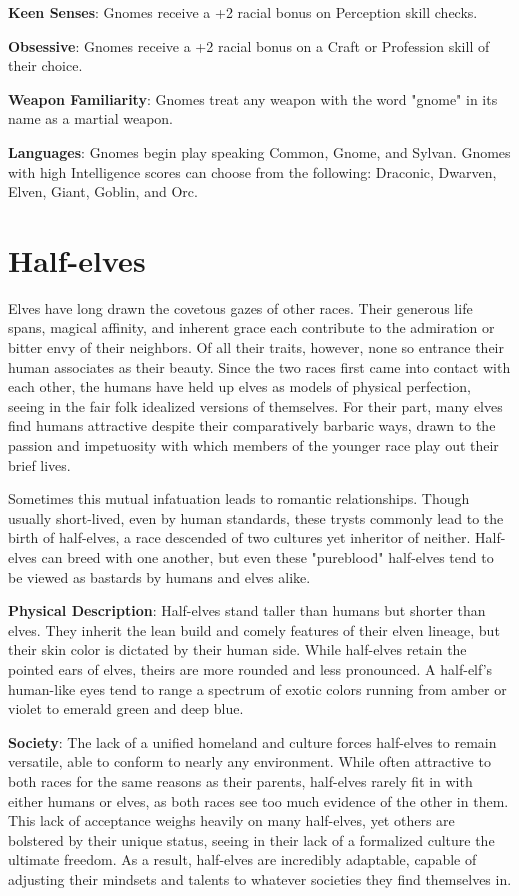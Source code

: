 \textbf{Keen Senses}: Gnomes receive a +2 racial bonus on Perception skill checks.
				
\textbf{Obsessive}: Gnomes receive a +2 racial bonus on a Craft or Profession skill of their choice.
				
\textbf{Weapon Familiarity}: Gnomes treat any weapon with the word "gnome" in its name as a martial weapon.
				
\textbf{Languages}: Gnomes begin play speaking Common, Gnome, and Sylvan. Gnomes with high Intelligence scores can choose from the following: Draconic, Dwarven, Elven, Giant, Goblin, and Orc.
							
\section{Half-elves}

				
Elves have long drawn the covetous gazes of other races. Their generous life spans, magical affinity, and inherent grace each contribute to the admiration or bitter envy of their neighbors. Of all their traits, however, none so entrance their human associates as their beauty. Since the two races first came into contact with each other, the humans have held up elves as models of physical perfection, seeing in the fair folk idealized versions of themselves. For their part, many elves find humans attractive despite their comparatively barbaric ways, drawn to the passion and impetuosity with which members of the younger race play out their brief lives.
				
Sometimes this mutual infatuation leads to romantic relationships. Though usually short-lived, even by human standards, these trysts commonly lead to the birth of half-elves, a race descended of two cultures yet inheritor of neither. Half-elves can breed with one another, but even these "pureblood" half-elves tend to be viewed as bastards by humans and elves alike.
				
\textbf{Physical Description}: Half-elves stand taller than humans but shorter than elves. They inherit the lean build and comely features of their elven lineage, but their skin color is dictated by their human side. While half-elves retain the pointed ears of elves, theirs are more rounded and less pronounced. A half-elf's human-like eyes tend to range a spectrum of exotic colors running from amber or violet to emerald green and deep blue.
				
\textbf{Society}: The lack of a unified homeland and culture forces half-elves to remain versatile, able to conform to nearly any environment. While often attractive to both races for the same reasons as their parents, half-elves rarely fit in with either humans or elves, as both races see too much evidence of the other in them. This lack of acceptance weighs heavily on many half-elves, yet others are bolstered by their unique status, seeing in their lack of a formalized culture the ultimate freedom. As a result, half-elves are incredibly adaptable, capable of adjusting their mindsets and talents to whatever societies they find themselves in. 
				
